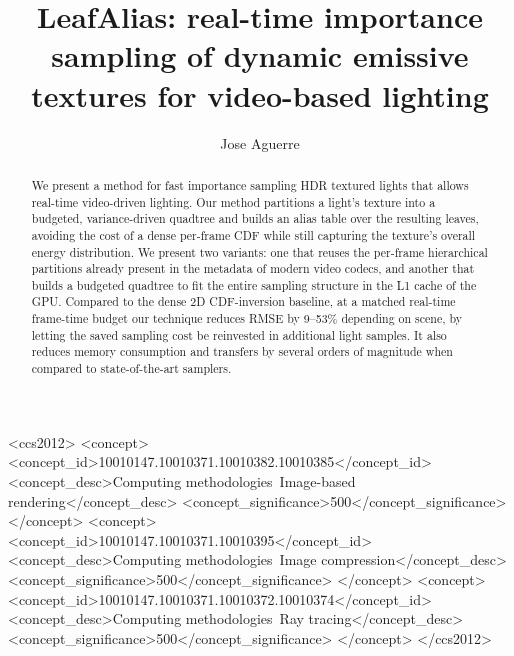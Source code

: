 \documentclass[acmtog,review,anonymous]{acmart}
\begin{document}
\title{LeafAlias: real-time importance sampling of dynamic emissive textures for video-based lighting}


\author{Jose Aguerre}

\graphicspath{{images/}}
\newcommand{\FLIP}{\protect\reflectbox{F}LIP\xspace}
\begin{abstract}
We present a method for fast importance sampling HDR textured lights that allows real-time video-driven lighting. 
Our method partitions a light's texture into a budgeted, variance-driven quadtree and builds an alias table over the resulting leaves, avoiding the cost of a dense per-frame CDF while still capturing
the texture's overall energy distribution. We present two variants: one that reuses the per-frame hierarchical partitions already present in the metadata of modern video codecs, and another that builds a budgeted quadtree to fit the entire sampling structure in the L1 cache of the GPU.
Compared to the dense 2D CDF-inversion baseline, at a matched real-time frame-time budget our technique reduces
RMSE by 9–53\% depending on scene, by letting the saved sampling cost be reinvested in additional light samples.
It also reduces memory consumption and transfers by several orders of magnitude when compared to state-of-the-art samplers.

\end{abstract}

\begin{CCSXML}
<ccs2012>
<concept>
<concept_id>10010147.10010371.10010382.10010385</concept_id>
<concept_desc>Computing methodologies~Image-based rendering</concept_desc>
<concept_significance>500</concept_significance>
</concept>
<concept>
<concept_id>10010147.10010371.10010395</concept_id>
<concept_desc>Computing methodologies~Image compression</concept_desc>
<concept_significance>500</concept_significance>
</concept>
<concept>
<concept_id>10010147.10010371.10010372.10010374</concept_id>
<concept_desc>Computing methodologies~Ray tracing</concept_desc>
<concept_significance>500</concept_significance>
</concept>
</ccs2012>
\end{CCSXML}
\end{document}
